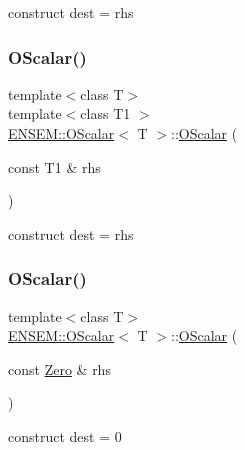 construct dest = rhs 

\mbox{\label{classENSEM_1_1OScalar_a63525278c1ba085f57cdc4aafe50aaa9}} 
\subsubsection{\texorpdfstring{OScalar()}{OScalar()}\hspace{0.1cm}{\footnotesize\ttfamily [4/18]}}
{\footnotesize\ttfamily template$<$class T$>$ \\
template$<$class T1 $>$ \\
\mbox{\hyperlink{classENSEM_1_1OScalar}{E\+N\+S\+E\+M\+::\+O\+Scalar}}$<$ T $>$\+::\mbox{\hyperlink{classENSEM_1_1OScalar}{O\+Scalar}} (\begin{DoxyParamCaption}\item[{const T1 \&}]{rhs }\end{DoxyParamCaption})\hspace{0.3cm}{\ttfamily [inline]}}



construct dest = rhs 

\mbox{\label{classENSEM_1_1OScalar_a9bc3830b1a4af2e67da73871396ae06c}} 
\subsubsection{\texorpdfstring{OScalar()}{OScalar()}\hspace{0.1cm}{\footnotesize\ttfamily [5/18]}}
{\footnotesize\ttfamily template$<$class T$>$ \\
\mbox{\hyperlink{classENSEM_1_1OScalar}{E\+N\+S\+E\+M\+::\+O\+Scalar}}$<$ T $>$\+::\mbox{\hyperlink{classENSEM_1_1OScalar}{O\+Scalar}} (\begin{DoxyParamCaption}\item[{const \mbox{\hyperlink{structENSEM_1_1Zero}{Zero}} \&}]{rhs }\end{DoxyParamCaption})\hspace{0.3cm}{\ttfamily [inline]}}



construct dest = 0 

